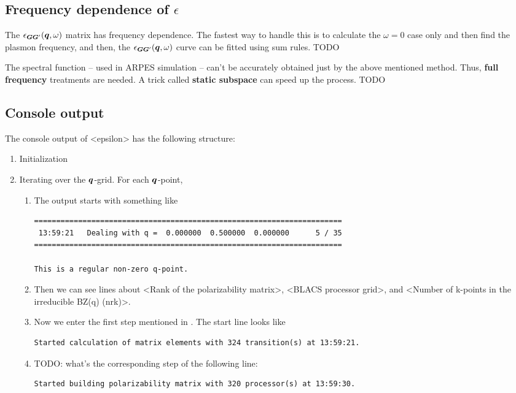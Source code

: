\documentclass[hyperref, a4paper]{report}
\newcommand*{\concept}[1]{{\textbf{#1}}}
\def\texttt#1{<#1>}%
\newcommand{\shortcode}[1]{\texttt{#1}}
\begin{document}
\subsection{Frequency dependence of $\epsilon$}

The $\epsilon_{\vb*{G} \vb*{G}'}(\vb*{q}, \omega)$ matrix has frequency dependence.
The fastest way to handle this is to calculate the $\omega = 0$ case only 
and then find the plasmon frequency,
and then, the $\epsilon_{\vb*{G} \vb*{G}'}(\vb*{q}, \omega)$ curve 
can be fitted using sum rules. TODO 

The spectral function -- used in ARPES simulation -- 
can't be accurately obtained just by the above mentioned method.
Thus, \concept{full frequency} treatments are needed.
A trick called \concept{static subspace} can speed up the process. TODO

\subsection{Console output}

The console output of \shortcode{epsilon} has the following structure:
\begin{enumerate}
    \item Initialization
    \item Iterating over the $\vb*{q}$-grid. For each $\vb*{q}$-point,
    \begin{enumerate}
        \item  The output starts with something like
        \begin{lstlisting}
====================================================================== 
 13:59:21   Dealing with q =  0.000000  0.500000  0.000000      5 / 35
======================================================================

This is a regular non-zero q-point.
        \end{lstlisting}
        \item Then we can see lines about 
        \shortcode{Rank of the polarizability matrix},
        \shortcode{BLACS processor grid},
        and \shortcode{Number of k-points in the irreducible BZ(q) (nrk)}.
        \item Now we enter the first step mentioned in .
        The start line looks like
        \begin{lstlisting}
Started calculation of matrix elements with 324 transition(s) at 13:59:21.
        \end{lstlisting}
        \item TODO: what's the corresponding step of the following line:
        \begin{lstlisting}
Started building polarizability matrix with 320 processor(s) at 13:59:30.
        \end{lstlisting}
    \end{enumerate}
\end{enumerate}
\end{document}
